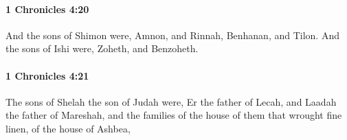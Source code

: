 		\paragraph{1 Chronicles 4:20} %
			\label{1CHRONICLES-4-20}

			And the sons of Shimon were, Amnon, and Rinnah, Benhanan, and Tilon. And the sons of Ishi were, Zoheth, and Benzoheth.


		\paragraph{1 Chronicles 4:21} %
			\label{1CHRONICLES-4-21}

			The sons of Shelah the son of Judah were, Er the father of Lecah, and Laadah the father of Mareshah, and the families of the house of them that wrought fine linen, of the house of Ashbea,


